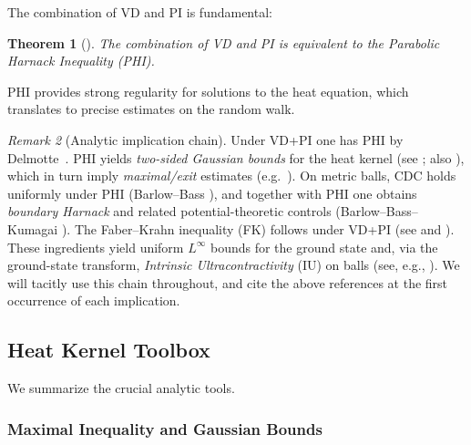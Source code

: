 \documentclass{article}
\numberwithin{equation}{section}
\newtheorem{theorem}{Theorem}[section]
\theoremstyle{definition}
\theoremstyle{remark}
\newtheorem{remark}[theorem]{Remark}
\begin{document}
The combination of VD and PI is fundamental:

\begin{theorem}[\cite{Delmotte99}]\label{thm:Delmotte}
The combination of VD and PI is equivalent to the Parabolic Harnack Inequality (PHI).
\end{theorem}

PHI provides strong regularity for solutions to the heat equation, which translates to precise estimates on the random walk.

\begin{remark}[Analytic implication chain]\label{rem:chain}
Under VD+PI one has PHI by Delmotte~\cite{Delmotte99}. PHI yields \emph{two-sided Gaussian bounds} for the heat kernel (see \cite{Delmotte99}; also \cite[§5.3]{Grigoryan09}), which in turn imply
\emph{maximal/exit} estimates (e.g.\ \cite[Thm.~5.5.3]{Grigoryan09}). On metric balls, CDC holds uniformly under PHI (Barlow–Bass \cite{BarlowBass04}), and together with PHI one obtains \emph{boundary Harnack} and related potential-theoretic controls (Barlow–Bass–Kumagai \cite{BarlowBassKumagai09}).
The Faber–Krahn inequality (FK) follows under VD+PI (see \cite[Ch.~8]{Grigoryan09} and \cite{BarlowBass04}).
These ingredients yield uniform $L^\infty$ bounds for the ground state and, via the ground-state transform, \emph{Intrinsic Ultracontractivity} (IU) on balls (see, e.g., \cite{Grigoryan09,BassKumagai08}).
We will tacitly use this chain throughout, and cite the above references at the first occurrence of each implication.
\end{remark}

\subsection{Heat Kernel Toolbox}
We summarize the crucial analytic tools.

\subsubsection{Maximal Inequality and Gaussian Bounds}
\end{document}
